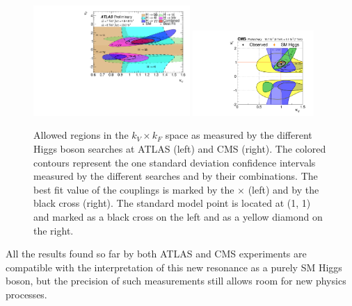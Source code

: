 \begin{figure}
        \centering
	\includegraphics[width=0.53\textwidth]{1_Introduction_Th_and_Exp/pics/fig_05b.pdf}
	\includegraphics[width=0.41\textwidth]{1_Introduction_Th_and_Exp/pics/cVcF_all_channels_2quadrant.pdf}
       \caption{Allowed regions in the $k_V \times k_F$ space as measured by the different Higgs boson searches at ATLAS (left) and CMS (right). The colored contours represent the one standard deviation confidence intervals measured by the different searches and by their combinations. The best fit value of the couplings is marked by the $\times$ (left) and by the black cross (right). The standard model point is located at (1, 1) and marked as a black cross on the left and as a yellow diamond on the right. }
       \label{fig:kvf}
\end{figure}

All the results found so far by both ATLAS and CMS experiments are compatible with the interpretation of this new resonance as a purely SM Higgs boson, but the precision of such measurements still allows room for new physics processes.



